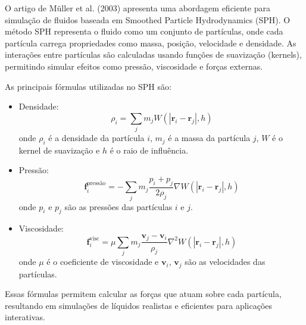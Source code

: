 O artigo de Müller et al. (2003) \cite{muller2003} apresenta uma abordagem eficiente para simulação de fluidos baseada em Smoothed Particle Hydrodynamics (SPH). O método SPH representa o fluido como um conjunto de partículas, onde cada partícula carrega propriedades como massa, posição, velocidade e densidade. As interações entre partículas são calculadas usando funções de suavização (kernels), permitindo simular efeitos como pressão, viscosidade e forças externas.

As principais fórmulas utilizadas no SPH são:

\begin{itemize}
  \item Densidade: $$
\rho_i = \sum_j m_j W(|\mathbf{r}_i - \mathbf{r}_j|, h)
$$
onde $\rho_i$ é a densidade da partícula $i$, $m_j$ é a massa da partícula $j$, $W$ é o kernel de suavização e $h$ é o raio de influência.

\item Pressão: $$
\mathbf{f}_i^{\text{pressão}} = -\sum_j m_j \frac{p_i + p_j}{2 \rho_j} \nabla W(|\mathbf{r}_i - \mathbf{r}_j|, h)
$$
onde $p_i$ e $p_j$ são as pressões das partículas $i$ e $j$.

\item Viscosidade: $$
\mathbf{f}_i^{\text{visc}} = \mu \sum_j m_j \frac{\mathbf{v}_j - \mathbf{v}_i}{\rho_j} \nabla^2 W(|\mathbf{r}_i - \mathbf{r}_j|, h) $$ onde $\mu$ é o coeficiente de viscosidade e $\mathbf{v}_i$, $\mathbf{v}_j$ são as velocidades das partículas.
\end{itemize}

Essas fórmulas permitem calcular as forças que atuam sobre cada partícula, resultando em simulações de líquidos realistas e eficientes para aplicações interativas.

